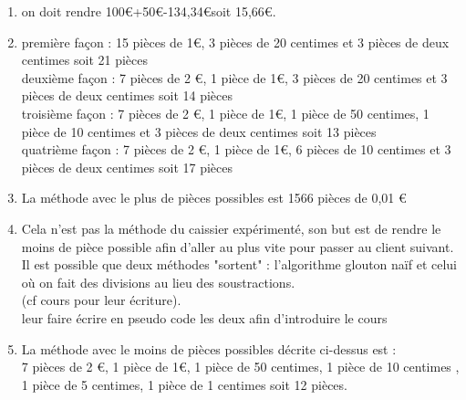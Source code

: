 \documentclass[12pt,french]{article}
\begin{document}
\begin{enumerate}
	\item on doit rendre 100\euro+50\euro-134,34\euro soit 15,66\euro.
	\item première façon : 15 pièces de 1\euro, 3 pièces de 20 centimes et 3 pièces de deux centimes soit 21 pièces\\
	deuxième façon : 7 pièces de 2 \euro, 1 pièce de 1\euro, 3 pièces de 20 centimes et 3 pièces de deux centimes soit 14 pièces\\
	troisième façon : 7 pièces de 2 \euro, 1 pièce de 1\euro, 1 pièce de 50 centimes, 1 pièce de 10 centimes et 3 pièces de deux centimes soit 13 pièces\\
	quatrième façon : 7 pièces de 2 \euro, 1 pièce de 1\euro, 6 pièces de 10 centimes et 3 pièces de deux centimes soit 17 pièces
\item La méthode avec le plus de pièces possibles est 1566 pièces de 0,01 \euro
\item Cela n'est pas la méthode du caissier expérimenté, son but est de rendre le moins de pièce possible afin d'aller au plus vite pour passer au client suivant.\\
Il est possible que deux méthodes "sortent" : l'algorithme glouton naïf et celui où on fait des divisions au lieu des soustractions.\\
(cf cours pour leur écriture).\\
leur faire écrire en pseudo code les deux afin d'introduire le cours
\item La méthode avec le moins de pièces possibles décrite ci-dessus est :\\
 7 pièces de 2 \euro, 1 pièce de 1\euro, 1 pièce de 50 centimes, 1 pièce de 10 centimes , 1 pièce de 5 centimes, 1 pièce de 1 centimes soit 12 pièces.
\end{enumerate}
\end{document}
